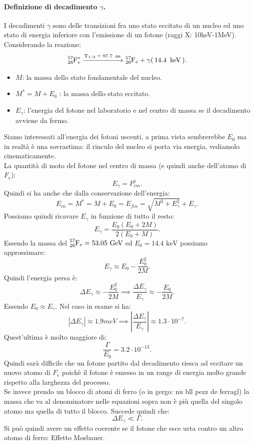 \paragraph{Definizione di decadimento $\gamma$.}
I decadimenti $\gamma$ sono delle transizioni fra uno stato eccitato di un nucleo ed uno stato di energia inferiore con l'emissione di un fotone (raggi X: 10keV-1MeV).\\
Considerando la reazione:
\[
	\ce{\ce{^{57}_{26}F^*_e} ->[T_{1/2} = 97.7 \text{ ns}] \ce{^{57}_{26}F_e} + \gamma ( 14.4 \text{ keV} ) }
.\] 
\begin{itemize}
	\item $M$: la massa dello stato fondamentale del nucleo.
	\item $M^* = M + E_0$ : la massa dello stato eccitato. 
	\item $E_\gamma$: l'energia del fotone nel laboratorio e nel centro di massa se il decadimento avviene da fermo.	
\end{itemize}
Siamo interessati all'energia dei fotoni uscenti, a prima vista sembrerebbe $E_0$ ma in realtà è una sovrastima: il rinculo del nucleo si porta via energia, vediamolo cinematicamente.\\ 
La quantità di moto del fotone nel centro di massa (e quindi anche dell'atomo di $F_e$):
\[
	E_\gamma = P^\gamma_{cm}
.\] 
Quindi si ha anche che dalla conservazione dell'energia:
\[
	E_{in} = M^* = M + E_0 = E_{fin} = \sqrt{M^2 + E_\gamma^2} + E_\gamma 
.\]
Possiamo quindi ricavare $E_\gamma$ in funzione di tutto il resto:
\[
	E_\gamma = \frac{E_0\left( E_0 + 2M \right)}{2\left( E_0 + M \right)} 
.\]
Essendo la massa del $\ce{^{57}_{26}F_e} = 53.05 \text{ GeV}$ ed $E_0 = 14.4 \text{ keV}$ possiamo approssimare:
\[
	E_\gamma  \approx E_0 - \frac{E_0^2}{2M}
.\] 
Quindi l'energia persa è:
\[
	\Delta E_\gamma \approx - \frac{E_0^2}{2M} \implies \frac{\Delta E_\gamma}{E_\gamma} \approx - \frac{E_0}{2M}  
.\]
Essendo $E_0 \approx E_\gamma$. Nel caso in esame si ha:
\[
	\left| \Delta E_\gamma \right| \approx 1.9 meV \implies \left| \frac{\Delta E_\gamma}{E_\gamma}\right| \approx 1.3 \cdot 10^{-7} 
.\] 
Quest'ultima è molto maggiore di:
\[
	\frac{\Gamma}{E_0} = 3.2 \cdot 10^{-13} 
.\] 
Quindi sarà difficile che un fotone partito dal decadimento riesca ad eccitare un nuovo atomo di $F_e$ poichè il fotone è emesso in un range di energia molto grande rispetto alla larghezza del processo.\\
Se invece prendo un blocco di atomi di ferro (o in gergo: nu bll pezz de ferragl) la massa che va al denominatore nelle equazioni sopra non è più quella del singolo atomo ma quella di tutto il blocco. Succede quindi che:
\[
	\Delta E_\gamma \ll \Gamma 
.\] 
Si può quindi avere un effetto coerente se il fotone che esce urta contro un altro atomo di ferro: Effetto Mosbauer.

